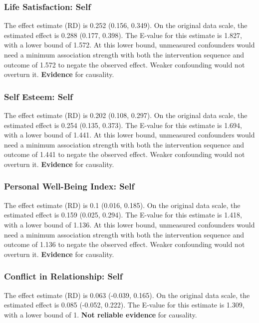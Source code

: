 \documentclass[
  singlecolumn]{article}
\begin{document}
\subsubsection{Life Satisfaction: Self}\label{life-satisfaction-self-14}

The effect estimate (RD) is 0.252 (0.156, 0.349). On the original data
scale, the estimated effect is 0.288 (0.177, 0.398). The E-value for
this estimate is 1.827, with a lower bound of 1.572. At this lower
bound, unmeasured confounders would need a minimum association strength
with both the intervention sequence and outcome of 1.572 to negate the
observed effect. Weaker confounding would not overturn it.
\textbf{Evidence} for causality.

\subsubsection{Self Esteem: Self}\label{self-esteem-self-14}

The effect estimate (RD) is 0.202 (0.108, 0.297). On the original data
scale, the estimated effect is 0.254 (0.135, 0.373). The E-value for
this estimate is 1.694, with a lower bound of 1.441. At this lower
bound, unmeasured confounders would need a minimum association strength
with both the intervention sequence and outcome of 1.441 to negate the
observed effect. Weaker confounding would not overturn it.
\textbf{Evidence} for causality.

\subsubsection{Personal Well-Being Index:
Self}\label{personal-well-being-index-self-14}

The effect estimate (RD) is 0.1 (0.016, 0.185). On the original data
scale, the estimated effect is 0.159 (0.025, 0.294). The E-value for
this estimate is 1.418, with a lower bound of 1.136. At this lower
bound, unmeasured confounders would need a minimum association strength
with both the intervention sequence and outcome of 1.136 to negate the
observed effect. Weaker confounding would not overturn it.
\textbf{Evidence} for causality.

\subsubsection{Conflict in Relationship:
Self}\label{conflict-in-relationship-self-14}

The effect estimate (RD) is 0.063 (-0.039, 0.165). On the original data
scale, the estimated effect is 0.085 (-0.052, 0.222). The E-value for
this estimate is 1.309, with a lower bound of 1. \textbf{Not reliable
evidence} for causality.
\end{document}
